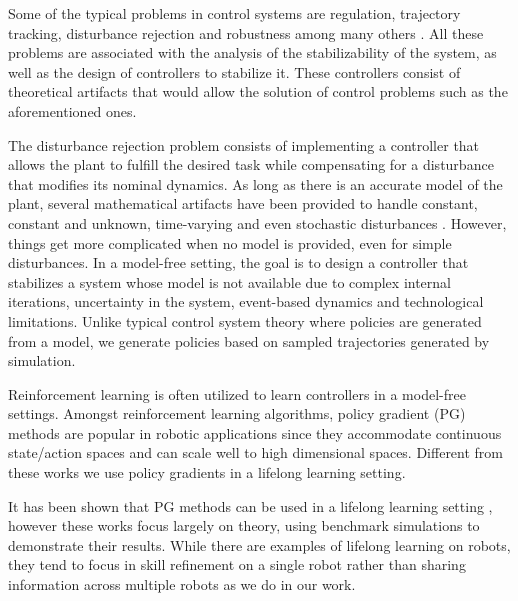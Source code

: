 \documentclass{aamas2016}
\begin{document}
Some of the typical problems in control systems are regulation, trajectory tracking, disturbance rejection and
robustness among many others \cite{Khalil-2002, Lewis-2012,Nise-2010}. All these problems are associated with the analysis of the stabilizability of the system, 
as well as the design of controllers to stabilize it. These controllers consist of theoretical artifacts that would allow 
the solution of control problems such as the aforementioned ones. 

The disturbance rejection problem consists of implementing a controller that allows the plant to fulfill the desired task while compensating
for a disturbance that modifies its nominal dynamics. As long as there is an accurate model of the plant, several mathematical
artifacts have been provided to handle constant, constant and unknown, time-varying and even stochastic disturbances 
\cite{Dorato-2000,Khalil-2002,Lewis-2012}. 
However, things get more complicated when no model is provided, even for simple disturbances. In a model-free setting, the goal is to design a 
controller that stabilizes a system whose model is not available due to complex internal iterations, uncertainty in the system, event-based
dynamics and technological limitations. Unlike typical control system theory where policies are generated from a model, we generate policies based on sampled trajectories generated by simulation.

Reinforcement learning \cite{kober2013reinforcement} is often utilized to learn controllers in a model-free settings. Amongst reinforcement learning algorithms, policy gradient (PG) methods \cite{sutton1999policy,williams1992simple} are popular in robotic applications \cite{kober2009policy,peters2008natural} since they accommodate continuous state/action spaces and can scale well to high dimensional spaces. Different from these works we use policy gradients in a lifelong learning setting.


It has been shown that PG methods can be used in a lifelong learning setting \cite{BouAmmar2014a,bouAmmar2015unsupervised}, however these works focus largely on theory, using benchmark simulations to demonstrate their results. While there are examples of lifelong learning on robots, they tend to focus in skill refinement on a single robot \cite{kleiner2002towards,thrun1995lifelong} rather than sharing information across multiple robots as we do in our work. 
\end{document}
